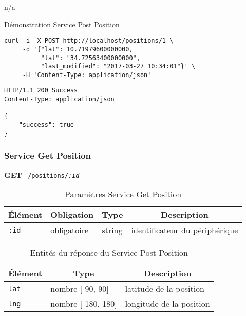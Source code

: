 n/a

\begin{listing}
    \caption*{Démonstration Service Post Position}
    \begin{verbatim}
curl -i -X POST http://localhost/positions/1 \
     -d '{"lat": 10.71979600000000,
          "lat": "34.72563400000000",
          "last_modified": "2017-03-27 10:34:01"}' \
     -H 'Content-Type: application/json'
\end{verbatim}
\begin{verbatim}
HTTP/1.1 200 Success
Content-Type: application/json

{
    "success": true
}
\end{verbatim}
\end{listing}

\clearpage
\subsubsection{Service Get Position}
\label{appendix:sprint1-position-get-doc}

\textbf{GET} \ \texttt{/positions/\textit{:id}}

\begin{table}[htbp]
    \centering
    \caption*{Paramètres Service Get Position}
    \begin{tabular}{llll}
        \toprule
        \multicolumn{1}{c}{\textbf{Élément}} &
        \multicolumn{1}{c}{\textbf{Obligation}} &
        \multicolumn{1}{c}{\textbf{Type}} &
        \multicolumn{1}{c}{\textbf{Description}} \\
        \midrule
        \verb|:id| & obligatoire & string & identificateur du périphérique \\
        \bottomrule
    \end{tabular}
\end{table}

\begin{table}[htbp]
    \centering
    \caption*{Entités du réponse du Service Post Position}
    \begin{tabular}{lll}
        \toprule
        \multicolumn{1}{c}{\textbf{Élément}} &
        \multicolumn{1}{c}{\textbf{Type}} &
        \multicolumn{1}{c}{\textbf{Description}} \\
        \midrule
        \verb|lat| & nombre [-90, 90] & latitude de la position \\
        \verb|lng| & nombre [-180, 180] & longitude de la position \\
        \bottomrule
    \end{tabular}
\end{table}

